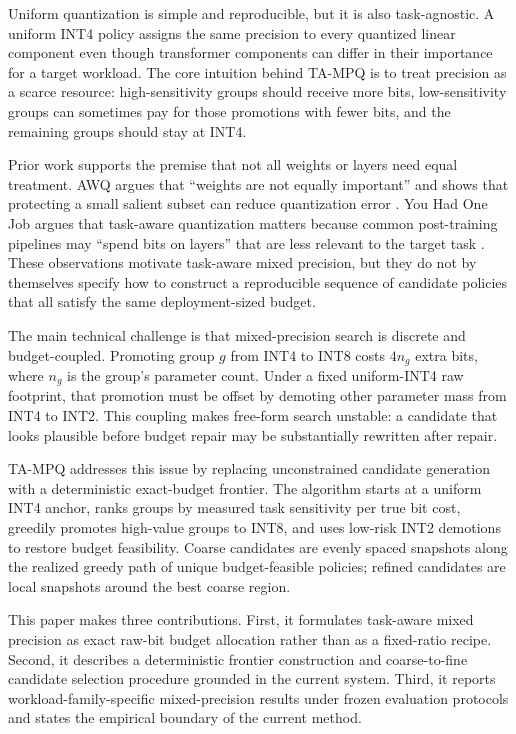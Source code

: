 \documentclass{article}
\newcommand{\method}{TA-MPQ}
\newcommand{\inttwo}{INT2}
\newcommand{\intfour}{INT4}
\newcommand{\inteight}{INT8}
\begin{document}
Uniform quantization is simple and reproducible, but it is also task-agnostic. A uniform \intfour{} policy assigns the same precision to every quantized linear component even though transformer components can differ in their importance for a target workload. The core intuition behind \method{} is to treat precision as a scarce resource: high-sensitivity groups should receive more bits, low-sensitivity groups can sometimes pay for those promotions with fewer bits, and the remaining groups should stay at \intfour{}.

Prior work supports the premise that not all weights or layers need equal treatment. AWQ argues that ``weights are not equally important'' and shows that protecting a small salient subset can reduce quantization error \cite{lin2024awq}. You Had One Job argues that task-aware quantization matters because common post-training pipelines may ``spend bits on layers'' that are less relevant to the target task \cite{levi2026youhadonejob}. These observations motivate task-aware mixed precision, but they do not by themselves specify how to construct a reproducible sequence of candidate policies that all satisfy the same deployment-sized budget.

The main technical challenge is that mixed-precision search is discrete and budget-coupled. Promoting group $g$ from \intfour{} to \inteight{} costs $4n_g$ extra bits, where $n_g$ is the group's parameter count. Under a fixed uniform-\intfour{} raw footprint, that promotion must be offset by demoting other parameter mass from \intfour{} to \inttwo{}. This coupling makes free-form search unstable: a candidate that looks plausible before budget repair may be substantially rewritten after repair.

\method{} addresses this issue by replacing unconstrained candidate generation with a deterministic exact-budget frontier. The algorithm starts at a uniform \intfour{} anchor, ranks groups by measured task sensitivity per true bit cost, greedily promotes high-value groups to \inteight{}, and uses low-risk \inttwo{} demotions to restore budget feasibility. Coarse candidates are evenly spaced snapshots along the realized greedy path of unique budget-feasible policies; refined candidates are local snapshots around the best coarse region.

This paper makes three contributions. First, it formulates task-aware mixed precision as exact raw-bit budget allocation rather than as a fixed-ratio recipe. Second, it describes a deterministic frontier construction and coarse-to-fine candidate selection procedure grounded in the current system. Third, it reports workload-family-specific mixed-precision results under frozen evaluation protocols and states the empirical boundary of the current method.
\end{document}
